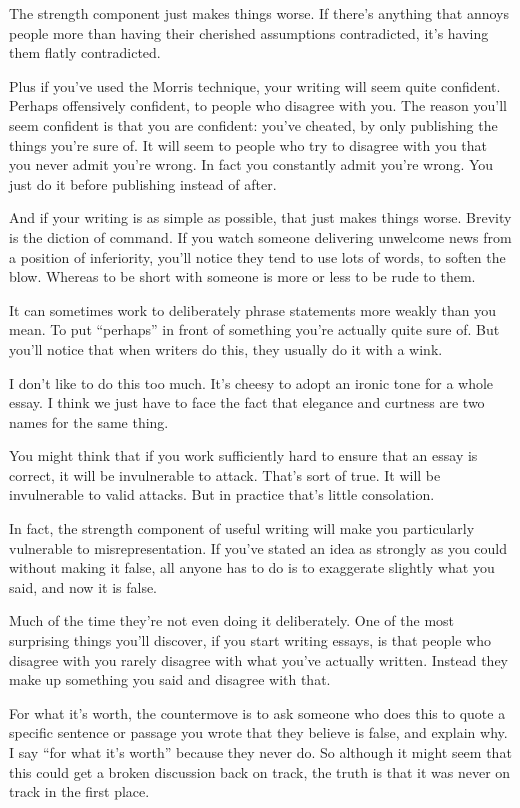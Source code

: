 The strength component just makes things worse. If there's anything that
annoys people more than having their cherished assumptions contradicted,
it's having them flatly contradicted.

Plus if you've used the Morris technique, your writing will seem quite
confident. Perhaps offensively confident, to people who disagree with
you. The reason you'll seem confident is that you are confident: you've
cheated, by only publishing the things you're sure of. It will seem to
people who try to disagree with you that you never admit you're wrong.
In fact you constantly admit you're wrong. You just do it before
publishing instead of after.

And if your writing is as simple as possible, that just makes things
worse. Brevity is the diction of command. If you watch someone
delivering unwelcome news from a position of inferiority, you'll notice
they tend to use lots of words, to soften the blow. Whereas to be short
with someone is more or less to be rude to them.

It can sometimes work to deliberately phrase statements more weakly than
you mean. To put ``perhaps'' in front of something you're actually quite
sure of. But you'll notice that when writers do this, they usually do it
with a wink.

I don't like to do this too much. It's cheesy to adopt an ironic tone
for a whole essay. I think we just have to face the fact that elegance
and curtness are two names for the same thing.

You might think that if you work sufficiently hard to ensure that an
essay is correct, it will be invulnerable to attack. That's sort of
true. It will be invulnerable to valid attacks. But in practice that's
little consolation.

In fact, the strength component of useful writing will make you
particularly vulnerable to misrepresentation. If you've stated an idea
as strongly as you could without making it false, all anyone has to do
is to exaggerate slightly what you said, and now it is false.

Much of the time they're not even doing it deliberately. One of the most
surprising things you'll discover, if you start writing essays, is that
people who disagree with you rarely disagree with what you've actually
written. Instead they make up something you said and disagree with that.

For what it's worth, the countermove is to ask someone who does this to
quote a specific sentence or passage you wrote that they believe is
false, and explain why. I say ``for what it's worth'' because they never
do. So although it might seem that this could get a broken discussion
back on track, the truth is that it was never on track in the first
place.

